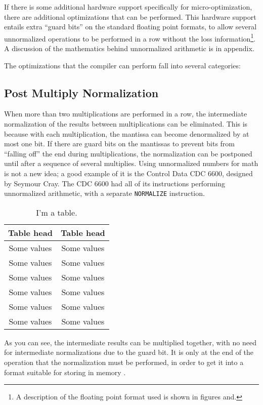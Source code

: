If there is some additional hardware support specifically for
micro-optimization, there are additional optimizations that can be
performed.  This hardware support entails extra ``guard bits'' on the
standard floating point formats, to allow several unnormalized operations to
be performed in a row without the loss information\footnote{A description of the floating point format used is shown in figures and.}.  A discussion of the mathematics behind
unnormalized arithmetic is in appendix.

The optimizations  that the compiler can perform fall into several categories:

\subsection{Post Multiply Normalization}

When more than two multiplications are performed in a row, the intermediate
normalization of the results between multiplications can be eliminated.
This is because with each multiplication, the mantissa can become
denormalized by at most one bit.  If there are guard bits on the mantissas
to prevent bits from ``falling off'' the end during multiplications, the
normalization can be postponed until after a sequence of several
multiplies. Using unnormalized numbers for math is not a new idea; a
good example of it is the Control Data CDC 6600, designed by Seymour Cray.
\cite{techreport-full,misc-full} The CDC 6600 had all of its instructions performing
unnormalized arithmetic, with a separate {\tt NORMALIZE} instruction.

\begin{table}[!ht]\label{table1}
	\centering
	\begin{tabular}[b]{|c|c|}\hline
		Table head  & Table head  \\ \hline
		Some values & Some values \\
		Some values & Some values \\
		Some values & Some values \\
		Some values & Some values \\
		Some values & Some values \\
		Some values & Some values \\ \hline
	\end{tabular}
	\caption{I'm a table.}
\end{table}

As you can see, the intermediate results can be multiplied together, with no
need for intermediate normalizations due to the guard bit.  It is only at
the end of the operation that the normalization must be performed, in order
to get it into a format suitable for storing in memory \cite{proceedings-full}.

